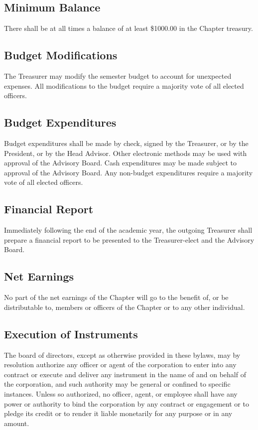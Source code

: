 \documentclass{article}
\begin{document}
	\subsection{Minimum Balance}
	There shall be at all times a balance of at least \$1000.00 in the Chapter treasury.
	\subsection{Budget Modifications}
	The Treasurer may modify the semester budget to account for unexpected expenses. All modifications to the budget require a majority vote of all elected officers.
	\subsection{Budget Expenditures}
	Budget expenditures shall be made by check, signed by the Treasurer, or by the President, or by the Head Advisor. Other electronic methods may be used with approval of the Advisory Board. Cash expenditures may be made subject to approval of the Advisory Board. Any non-budget expenditures require a majority vote of all elected officers. %
	\subsection{Financial Report}
	Immediately following the end of the academic year, the outgoing Treasurer shall prepare a financial report to be presented to the Treasurer-elect and the Advisory Board.
	\subsection{Net Earnings}
	No part of the net earnings of the Chapter will go to the benefit of, or be distributable to, members or officers of the Chapter or to any other individual.
	\subsection{Execution of Instruments}
	The board of directors, except as otherwise provided in these bylaws, may by resolution authorize any officer or agent of the corporation to enter into any contract or execute and deliver any instrument in the name of and on behalf of the corporation, and such authority may be general or confined to specific instances. Unless so authorized, no officer, agent, or employee shall have any power or authority to bind the corporation by any contract or engagement or to pledge its credit or to render it liable monetarily for any purpose or in any amount.
\end{document}
